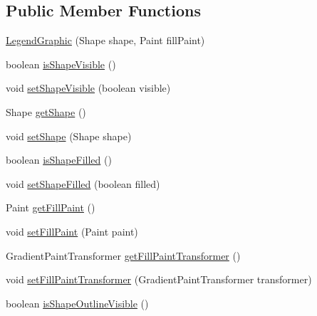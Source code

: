 \subsection*{Public Member Functions}
\begin{DoxyCompactItemize}
\item 
\mbox{\hyperlink{classorg_1_1jfree_1_1chart_1_1title_1_1_legend_graphic_ae1f2e1dfb5b814ac71b3b2d68a357435}{Legend\+Graphic}} (Shape shape, Paint fill\+Paint)
\item 
boolean \mbox{\hyperlink{classorg_1_1jfree_1_1chart_1_1title_1_1_legend_graphic_adce25f6b685e2135236b4cdf0e555a43}{is\+Shape\+Visible}} ()
\item 
void \mbox{\hyperlink{classorg_1_1jfree_1_1chart_1_1title_1_1_legend_graphic_a9e9b25b9ffb71d4945bf4f873b74bb26}{set\+Shape\+Visible}} (boolean visible)
\item 
Shape \mbox{\hyperlink{classorg_1_1jfree_1_1chart_1_1title_1_1_legend_graphic_ab29b7497783a46d5ed00993aed529575}{get\+Shape}} ()
\item 
void \mbox{\hyperlink{classorg_1_1jfree_1_1chart_1_1title_1_1_legend_graphic_a31d10a0f353ee943dd459932f7dcfc99}{set\+Shape}} (Shape shape)
\item 
boolean \mbox{\hyperlink{classorg_1_1jfree_1_1chart_1_1title_1_1_legend_graphic_a7412e8640137319e0b3e1ec86d51170a}{is\+Shape\+Filled}} ()
\item 
void \mbox{\hyperlink{classorg_1_1jfree_1_1chart_1_1title_1_1_legend_graphic_ae11a7c5618cce84ce2e0614a1c033572}{set\+Shape\+Filled}} (boolean filled)
\item 
Paint \mbox{\hyperlink{classorg_1_1jfree_1_1chart_1_1title_1_1_legend_graphic_aa60ec88ec6d9bf1897d052aed4ca688a}{get\+Fill\+Paint}} ()
\item 
void \mbox{\hyperlink{classorg_1_1jfree_1_1chart_1_1title_1_1_legend_graphic_a3c8d58ed6cc6ea596e53f3ae782ae84a}{set\+Fill\+Paint}} (Paint paint)
\item 
Gradient\+Paint\+Transformer \mbox{\hyperlink{classorg_1_1jfree_1_1chart_1_1title_1_1_legend_graphic_ae51819918572b58034792a02bc865bd3}{get\+Fill\+Paint\+Transformer}} ()
\item 
void \mbox{\hyperlink{classorg_1_1jfree_1_1chart_1_1title_1_1_legend_graphic_ae89deacb22526a33371d0b781ac13a62}{set\+Fill\+Paint\+Transformer}} (Gradient\+Paint\+Transformer transformer)
\item 
boolean \mbox{\hyperlink{classorg_1_1jfree_1_1chart_1_1title_1_1_legend_graphic_afb3dad5bedac047e7a37b67ff0778322}{is\+Shape\+Outline\+Visible}} ()

\end{DoxyCompactItemize}
